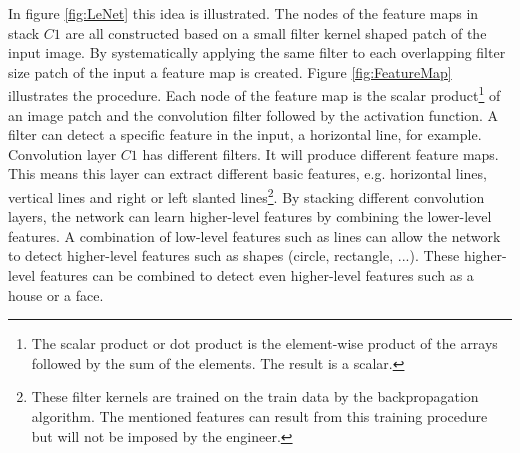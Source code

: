 \par{
    In figure \ref{fig:LeNet} this idea is illustrated. 
    The nodes of the feature maps in stack $C1$ are all constructed based on a small filter kernel shaped patch of the input image.
    By systematically applying the same filter to each overlapping filter size patch of the input a feature map is created. 
    Figure \ref{fig:FeatureMap} illustrates the procedure. 
    Each node of the feature map is the scalar product\footnote{The scalar product or dot product is the element-wise product of the arrays followed by the sum of the elements. The result is a scalar.} 
    of an image patch and the convolution filter followed by the activation function.
    A filter can detect a specific feature in the input, a horizontal line, for example. 
    Convolution layer $C1$ has different filters. 
    It will produce different feature maps.
    This means this layer can extract different basic features, e.g. horizontal lines, vertical lines and right or left slanted lines\footnote{
        These filter kernels are trained on the train data by the backpropagation algorithm. The mentioned features can result from this training procedure but will not be imposed by the engineer.
        }.
    By stacking different convolution layers, the network can learn higher-level features by combining the lower-level features.
    A combination of low-level features such as lines can allow the network to detect higher-level features such as shapes (circle, rectangle, ...).
    These higher-level features can be combined to detect even higher-level features such as a house or a face.
}
